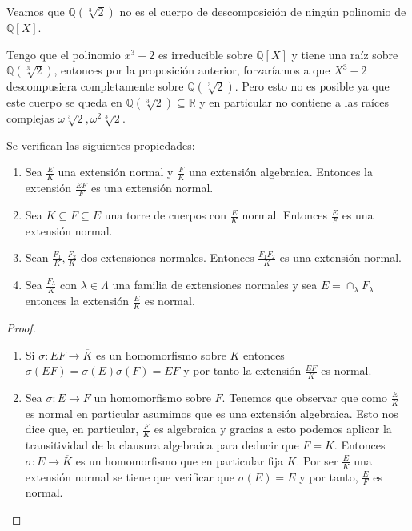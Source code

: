 \begin{example}
	Veamos que $\mathbb{Q}(\sqrt[3]{2})$ no es el cuerpo de descomposición de ningún
	polinomio de $\mathbb{Q}[X]$.
	
	Tengo que el polinomio $x^3-2$ es irreducible sobre $\mathbb{Q}[X]$ y tiene una raíz sobre $\mathbb{Q}(\sqrt[3]{2})$, entonces por la proposición anterior, forzaríamos a que $X^3-2$ descompusiera completamente sobre $\mathbb{Q}(\sqrt[3]{2})$. Pero esto no es posible ya que este cuerpo se queda en $\mathbb{Q}(\sqrt[3]{2}) \subseteq \mathbb{R}$ y en particular no contiene a las raíces complejas $\omega \sqrt[3]{2},\omega^2 \sqrt[3]{2}$.
\end{example}

\begin{proposition}
Se verifican las siguientes propiedades:

\begin{enumerate}
\item Sea $\frac{E}{K}$ una extensión normal y $\frac{F}{K}$ una extensión algebraica. Entonces la extensión $\frac{EF}{F}$ es una extensión normal. 
\item Sea $K \subseteq F \subseteq E$ una torre de cuerpos con $\frac{E}{K}$ normal. Entonces $\frac{E}{F}$ es una extensión normal. 
\item Sean $\frac{F_1}{K},\frac{F_2}{K}$ dos extensiones normales. Entonces $\frac{F_1F_2}{K}$ es una extensión normal. 
\item Sea $\frac{F_\lambda}{K}$ con $\lambda \in \Lambda$ una familia de extensiones normales y sea $E = \cap_\lambda F_\lambda$ entonces la extensión $\frac{E}{K}$ es normal. 
\end{enumerate}
\end{proposition}
\begin{proof}
\begin{enumerate}
\item Si $\sigma:EF \to \overline{K}$ es un homomorfismo sobre $K$ entonces $\sigma(EF) = \sigma(E)\sigma(F) = EF$ y por tanto la extensión $\frac{EF}{K}$ es normal. 
\item Sea $\sigma:E \to \overline{F}$ un homomorfismo sobre $F$. Tenemos que observar que como $\frac{E}{K}$ es normal en particular asumimos que es una extensión algebraica. Esto nos dice que, en particular, $\frac{F}{K}$ es algebraica y gracias a esto podemos aplicar la transitividad de la clausura algebraica para deducir que $\overline{F} = \overline{K}$. Entonces $\sigma:E \to \overline{K}$ es un homomorfismo que en particular fija $K$. Por ser $\frac{E}{K}$ una extensión normal se tiene que verificar que $\sigma(E) = E$ y por tanto, $\frac{E}{F}$ es normal. 
\end{enumerate}
\end{proof}


